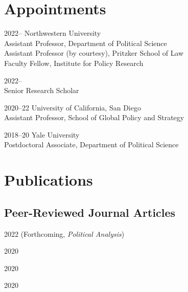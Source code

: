 \documentclass[12pt,letterpaper]{report}
\begin{document}
    \section*{Appointments}

    \begin{tablist}
        \item[2022--]  \tab{}Northwestern University\\
                        Assistant Professor, Department of Political Science \\
                        Assistant Professor (by courtesy), Pritzker School of Law \\
                        Faculty Fellow, Institute for Policy Research \\
                        
                        
        \item[2022--]   \\
                        Senior Research Scholar \\
                        
        \item[2020--22]   \tab{}University of California, San Diego \\
                             Assistant Professor, School of Global Policy and Strategy \\

        \item[2018--20] \tab{}Yale University \\
                             Postdoctoral Associate, Department of Political Science \\ 

    \end{tablist}
    
    \section*{Publications}

    \subsection*{Peer-Reviewed Journal Articles}
    \begin{tablist}
    \item[2022] \tab{} (Forthcoming, \textit{Political Analysis})
    \item[2020] \tab{}
    
    \item[2020] \tab{}
    
    \item[2020] \tab{}
    \end{tablist}
    
\end{document}
